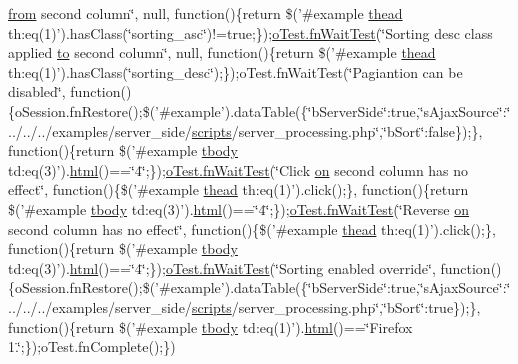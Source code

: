 \begin{DoxyCompactItemize}
\hyperlink{jquery-ui_8js_ace03b192fd101a1c5648340bc09b7229}{from} second column\char`\"{}, null, function()\{return \$('\#example \hyperlink{core_8constructor_8js_a856be760b6816c9591ce69f0a2b43693}{thead} th\+:eq(1)').has\+Class(\char`\"{}sorting\+\_\+asc\char`\"{})!=true;\});\hyperlink{onhold_24__server-side_2__zero__config_8js_ab25c4d596771c0133cdc45178ce72c3d}{o\+Test.\+fn\+Wait\+Test}(\char`\"{}Sorting desc class applied \hyperlink{jquery-ui_8js_af6086621f45baa2cf538f19e45d3c263}{to} second column\char`\"{}, null, function()\{return \$('\#example \hyperlink{core_8constructor_8js_a856be760b6816c9591ce69f0a2b43693}{thead} th\+:eq(1)').has\+Class(\char`\"{}sorting\+\_\+desc\char`\"{});\});o\+Test.\+fn\+Wait\+Test(\char`\"{}Pagiantion can be disabled\char`\"{}, function()\{o\+Session.\+fn\+Restore();\$('\#example').data\+Table(\{\char`\"{}b\+Server\+Side\char`\"{}\+:true,\char`\"{}s\+Ajax\+Source\char`\"{}\+:\char`\"{}../../../examples/server\+\_\+side/\hyperlink{tinymce_8jquery_8dev_8js_a09066d4d580eeec222f858d588b4cdef}{scripts}/server\+\_\+processing.\+php\char`\"{},\char`\"{}b\+Sort\char`\"{}\+:false\});\}, function()\{return \$('\#example \hyperlink{core_8constructor_8js_a99b0542c7c50fe8757c55bf9dac5f3be}{tbody} td\+:eq(3)').\hyperlink{tinymce_8jquery_8dev_8js_ac2090bcf2ff968c0083d5de53a6544f3}{html}()==\char`\"{}4\char`\"{};\});\hyperlink{onhold_24__server-side_2__zero__config_8js_ab25c4d596771c0133cdc45178ce72c3d}{o\+Test.\+fn\+Wait\+Test}(\char`\"{}Click \hyperlink{fullpage_2plugin_8min_8js_a1cfa98b7fed2aaf9fee3b68dbb7f9497}{on} second column has no effect\char`\"{}, function()\{\$('\#example \hyperlink{core_8constructor_8js_a856be760b6816c9591ce69f0a2b43693}{thead} th\+:eq(1)').click();\}, function()\{return \$('\#example \hyperlink{core_8constructor_8js_a99b0542c7c50fe8757c55bf9dac5f3be}{tbody} td\+:eq(3)').\hyperlink{tinymce_8jquery_8dev_8js_ac2090bcf2ff968c0083d5de53a6544f3}{html}()==\char`\"{}4\char`\"{};\});\hyperlink{onhold_24__server-side_2__zero__config_8js_ab25c4d596771c0133cdc45178ce72c3d}{o\+Test.\+fn\+Wait\+Test}(\char`\"{}Reverse \hyperlink{fullpage_2plugin_8min_8js_a1cfa98b7fed2aaf9fee3b68dbb7f9497}{on} second column has no effect\char`\"{}, function()\{\$('\#example \hyperlink{core_8constructor_8js_a856be760b6816c9591ce69f0a2b43693}{thead} th\+:eq(1)').click();\}, function()\{return \$('\#example \hyperlink{core_8constructor_8js_a99b0542c7c50fe8757c55bf9dac5f3be}{tbody} td\+:eq(3)').\hyperlink{tinymce_8jquery_8dev_8js_ac2090bcf2ff968c0083d5de53a6544f3}{html}()==\char`\"{}4\char`\"{};\});\hyperlink{onhold_24__server-side_2__zero__config_8js_ab25c4d596771c0133cdc45178ce72c3d}{o\+Test.\+fn\+Wait\+Test}(\char`\"{}Sorting enabled override\char`\"{}, function()\{o\+Session.\+fn\+Restore();\$('\#example').data\+Table(\{\char`\"{}b\+Server\+Side\char`\"{}\+:true,\char`\"{}s\+Ajax\+Source\char`\"{}\+:\char`\"{}../../../examples/server\+\_\+side/\hyperlink{tinymce_8jquery_8dev_8js_a09066d4d580eeec222f858d588b4cdef}{scripts}/server\+\_\+processing.\+php\char`\"{},\char`\"{}b\+Sort\char`\"{}\+:true\});\}, function()\{return \$('\#example \hyperlink{core_8constructor_8js_a99b0542c7c50fe8757c55bf9dac5f3be}{tbody} td\+:eq(1)').\hyperlink{tinymce_8jquery_8dev_8js_ac2090bcf2ff968c0083d5de53a6544f3}{html}()==\char`\"{}Firefox 1.\char`\"{};\});o\+Test.\+fn\+Complete();\})

\end{DoxyCompactItemize}

